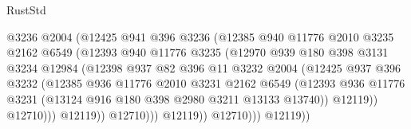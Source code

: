 \begin{lexlean}{RustStd}
\begin{coremodule}
                                  @3236
                                  @2004
                                  (@12425
                                    @941
                                    @396
                                    @3236
                                    (@12385
                                      @940
                                      @11776
                                      @2010
                                      @3235
                                      @2162
                                      @6549
                                      (@12393
                                        @940
                                        @11776
                                        @3235
                                        (@12970
                                          @939
                                          @180
                                          @398
                                          @3131
                                          @3234
                                          @12984
                                          (@12398
                                            @937
                                            @82
                                            @396
                                            @11
                                            @3232
                                            @2004
                                            (@12425
                                              @937
                                              @396
                                              @3232
                                              (@12385
                                                @936
                                                @11776
                                                @2010
                                                @3231
                                                @2162
                                                @6549
                                                (@12393
                                                  @936
                                                  @11776
                                                  @3231
                                                  (@13124 @916 @180 @398 @2980 @3211 @13133 @13740))
                                                @12119))
                                            @12710)))
                                      @12119))
                                  @12710)))
                            @12119))
                        @12710)))
                  @12119))

\end{coremodule}
\end{lexlean}
